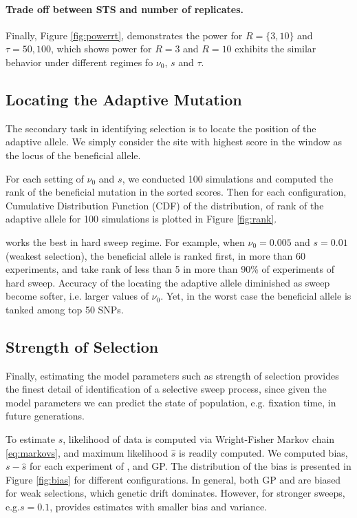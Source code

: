 \documentclass[11pt]{article}
\def\comale{\text{COMALE }}
\begin{document}
\paragraph{Trade off between STS and number of replicates.}
Finally, Figure \ref{fig:powerrt}, 
demonstrates the power for $R=\{3,10\}$ and $\tau={50,100}$, which shows power 
for $R=3$ and $R=10$ exhibits the similar behavior under different regimes fo 
$\nu_0$, $s$ and $\tau$.

\subsection{Locating the Adaptive Mutation}
The secondary task in identifying selection is to locate the position of the 
adaptive allele. We simply consider the site with highest score in the window 
as the locus of the beneficial allele. 

For each setting of $\nu_0$ and $s$, we conducted 100 
simulations and computed the rank of the beneficial mutation in the sorted 
scores. Then for each configuration, Cumulative Distribution Function (CDF) of 
the distribution, of rank of the adaptive allele for 100 
simulations is plotted in Figure \ref{fig:rank}. 

\comale works the best in hard sweep regime. For example, 
when $\nu_0=0.005$ and $s=0.01$ (weakest selection), the beneficial allele is 
ranked first, in more than 60 experiments, and take rank of less than 5 in more 
than 90\% of experiments of hard sweep. Accuracy of the locating the adaptive 
allele diminished as sweep become softer, i.e. larger values of $\nu_0$. Yet, 
in the worst case the beneficial allele is tanked among top 50 SNPs.

\subsection{Strength of  Selection}
Finally, estimating the model parameters such as strength of selection provides 
the finest detail of identification of a selective sweep process, since given 
the model parameters we can predict the state of population, e.g. fixation 
time, in future generations. 

To estimate $s$, likelihood of data is computed via Wright-Fisher Markov chain 
\eqref{eq:markovs}, and maximum likelihood $\hat{s}$ is readily computed.
We computed bias, $s-\hat{s}$ for each 
experiment of \comale, and GP. The distribution of the bias is presented in 
Figure 
\ref{fig:bias} for different configurations. In general, both GP and  \comale 
are 
biased for weak selections, which genetic drift dominates. However, for 
stronger sweeps, e.g.$s=0.1$, \comale provides estimates with smaller bias and 
variance.
\end{document}
